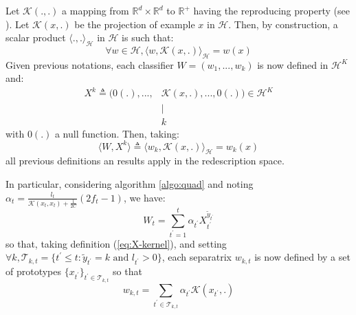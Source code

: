 \documentclass[preprint,12pt,authoryear]{elsarticle}
\begin{document}
Let $\mathcal{K}(.,.)$ a mapping from $ \mathbb{R}^d \times \mathbb{R}^d$ to $ \mathbb{R}^+$ having the reproducing property (see \cite{scholkopf2002learning}). Let $\mathcal{K}(x,.)$ be the projection of example $x$ in $\mathcal{H}$. Then, by construction, a scalar product $\langle.,.\rangle_\mathcal{H}$ in $\mathcal{H}$ is such that: 
 $$\forall w \in \mathcal{H}, \langle w,\mathcal{K}(x,.)\rangle_\mathcal{H} = w(x) $$
Given previous notations, each classifier $W = (w_1,...,w_k)$ is now defined in $\mathcal{H}^K$ and:
 \begin{align}\label{eq:X-kernel}
 X^k \triangleq (0(.), ..., & \mathcal{K}(x,.), ..., 0(.)) \in \mathcal{H}^{K}\\
 &\mid\nonumber\\
 &k\nonumber
 \end{align}
with $0(.)$ a null function. Then, taking:
$$\langle W,X^k\rangle \triangleq \langle w_k,\mathcal{K}(x,.)\rangle_\mathcal{H} = w_k(x)$$
all previous definitions an results apply in the redescription space.



In particular, considering algorithm \ref{algo:quad} and noting $\alpha_t = \frac {l_{t}}{\mathcal{K}(x_{t},x_{t})+\frac{1}{2C}} (2f_{t} - 1)$, we have:
$$W_t = \sum_{t^\prime = 1} ^t \alpha_{t^\prime} X_{t^\prime}^{\tilde{y}_{t^\prime}} 
$$
so that, taking definition (\ref{eq:X-kernel}), and setting $\forall k, \mathcal{T}_{k,t} = \{{t^{\prime}} \leq t: \tilde{y}_{t^{\prime}} = k \text{ and } l_{t^{\prime}} > 0\}$, each 
separatrix $w_{k,t}$ is now defined by a set of prototypes 
$\{x_{t^{\prime}}\}_{{t^{\prime}}\in \mathcal{T}_{k,t}}$ 
so that 
	$$w_{k,t} = \sum_{t^{\prime}\in \mathcal{T}_{k,t}} \alpha_{t^{\prime}} \mathcal{K}(x_{t^{\prime}},.)$$
\end{document}
